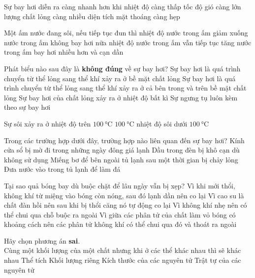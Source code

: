 \begin{ex}
Sự bay hơi diễn ra càng nhanh hơn khi
\choice
{ nhiệt độ càng thấp}
{\True tốc độ gió càng lớn}
{ lượng chất lỏng càng nhiều}
{ diện tích mặt thoáng càng hẹp}
\loigiai{ }
\end{ex}
\begin{ex}
Một ấm nước đang sôi, nếu tiếp tục đun thì
\choice
{ nhiệt độ nước trong ấm giảm xuống}
{ nước trong ấm không bay hơi nữa}
{ nhiệt độ nước trong ấm vẫn tiếp tục tăng}
{\True nước trong ấm bay hơi nhiều hơn và cạn dần}
\loigiai{ }
\end{ex}
\begin{ex}
Phát biểu nào sau đây là \textbf{không đúng} về sự bay hơi?
\choice
{ Sự bay hơi là quá trình chuyển từ thể lỏng sang thể khí xảy ra ở bề mặt chất lỏng}
{\True Sự bay hơi là quá trình chuyển từ thể lỏng sang thể khí xảy ra ở cả bên trong và trên bề mặt chất lỏng}
{ Sự bay hơi của chất lỏng xảy ra ở nhiệt độ bất kì}
{ Sự ngưng tụ luôn kèm theo sự bay hơi}
\loigiai{ }
\end{ex}
\begin{ex}
Sự sôi xảy ra ở
\choice
{ nhiệt độ trên $\SI{100}{\celsius}$}
{ $\SI{100}{\celsius}$}
{\True nhiệt độ sôi}
{ dưới $\SI{100}{\celsius}$}
\loigiai{ }
\end{ex}
\begin{ex}
Trong các trường hợp dưới đây, trường hợp nào liên quan đến sự bay hơi?
\choice
{ Kính cửa sổ bị mờ đi trong những ngày đông giá lạnh}
{\True Dầu trong đèn bị khô cạn dù không sử dụng}
{ Miếng bơ để bên ngoài tủ lạnh sau một thời gian bị chảy lỏng}
{ Đưa nước vào trong tủ lạnh để làm đá}
\loigiai{ }
\end{ex}
\begin{ex}
Tại sao quả bóng bay dù buộc chặt để lâu ngày vẫn bị xẹp?
\choice
{ Vì khi mới thổi, không khí từ miệng vào bóng còn nóng, sau đó lạnh dần nên co lại}
{ Vì cao su là chất đàn hồi nên sau khi bị thổi căng nó tự động co lại}
{ Vì không khí nhẹ nên có thể chui qua chỗ buộc ra ngoài}
{\True Vì giữa các phân tử của chất làm vỏ bóng có khoảng cách nên các phân tử không khí có thể chui qua đó và thoát ra ngoài}
\loigiai{ }
\end{ex}
\begin{ex}
Hãy chọn phương án \textbf{sai}.\\
Cùng một khối lượng của một chất nhưng khi ở các thể khác nhau thì sẽ khác nhau
\choice
{ Thể tích}
{ Khối lượng riêng}
{\True Kích thước của các nguyên tử}
{ Trật tự của các nguyên tử}
\loigiai{ }
\end{ex}
